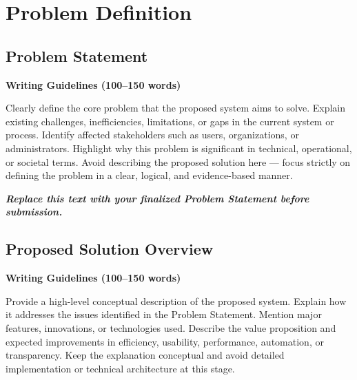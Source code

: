 
\chapter{Problem Definition}

\section{Problem Statement}

\textbf{Writing Guidelines (100–150 words)}

Clearly define the core problem that the proposed system aims to solve. 
Explain existing challenges, inefficiencies, limitations, or gaps in the 
current system or process. Identify affected stakeholders such as users, 
organizations, or administrators. Highlight why this problem is significant 
in technical, operational, or societal terms. Avoid describing the proposed 
solution here — focus strictly on defining the problem in a clear, logical, 
and evidence-based manner.

\vspace{0.5cm}

\textbf{\textit{Replace this text with your finalized Problem Statement before submission.}}




\section{Proposed Solution Overview}

\textbf{Writing Guidelines (100–150 words)}

Provide a high-level conceptual description of the proposed system. 
Explain how it addresses the issues identified in the Problem Statement. 
Mention major features, innovations, or technologies used. Describe 
the value proposition and expected improvements in efficiency, usability, 
performance, automation, or transparency. Keep the explanation conceptual 
and avoid detailed implementation or technical architecture at this stage.

\vspace{0.5cm}

